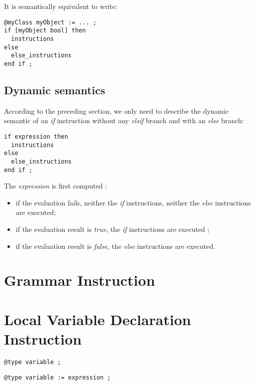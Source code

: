 It is semantically equivalent to write:
{
\begin{lstlisting}[language=galgas]
@myClass myObject := ... ;
if [myObject bool] then
  instructions
else
  else_instructions
end if ;
\end{lstlisting}
}


\subsection{Dynamic semantics}

According to the preceding section, we only need to describe the dynamic semantic of an \emph{if} instruction without any \emph{elsif} branch and with an \emph{else} branch:
{
\begin{lstlisting}[language=galgas]
if expression then
  instructions
else
  else_instructions
end if ;  
\end{lstlisting}
}



The \emph{expression} is first computed :
\begin{itemize}
\item if the evaluation fails, neither the \emph{if} instructions, neither the \emph{else} instructions are executed;
\item if the evaluation result is \emph{true}, the \emph{if} instructions are executed ;
\item if the evaluation result is \emph{false}, the \emph{else} instructions are executed.
\end{itemize}


\section{Grammar Instruction}

\section{Local Variable Declaration Instruction}


{
\begin{lstlisting}[language=galgas]
@type variable ;
\end{lstlisting}
}

{
\begin{lstlisting}[language=galgas]
@type variable := expression ;
\end{lstlisting}
}


